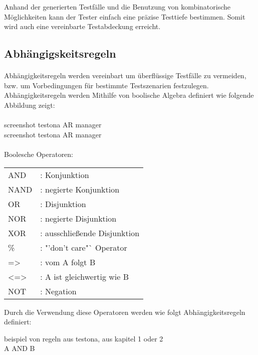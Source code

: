 Anhand der generierten Testfälle und die Benutzung von  kombinatorische Möglichkeiten kann der Tester einfach eine präzise Testtiefe bestimmen. Somit wird auch eine vereinbarte Testabdeckung erreicht.

\subsection{Abhängigskeitsregeln}
\paragraph{}

Abhängigkeitsregeln werden vereinbart um überflüssige Testfälle zu vermeiden, bzw. um Vorbedingungen für bestimmte Testszenarien festzulegen. Abhängigkeitsregeln werden Mithilfe von boolische Algebra definiert wie folgende Abbildung %
zeigt: \\
\\
screenshot testona AR manager\\
screenshot testona AR manager\\
\\
Boolesche Operatoren:\\

\begin{tabular}{ll}
AND &: Konjunktion\\
NAND &: negierte Konjunktion\\
OR &: Disjunktion\\
NOR &: negierte Disjunktion\\
XOR &: ausschließende Disjunktion\\
\% &: "'don't care"` Operator\\
=> &: vom A folgt B\\
<=> &: A ist gleichwertig wie B\\
NOT &: Negation\\
\end{tabular}

Durch die Verwendung diese Operatoren werden wie folgt Abhängigkeitsregeln definiert:\\

\begin{center}
beispiel von regeln aus testona, aus kapitel 1 oder 2\\
A AND B 
\end{center}




